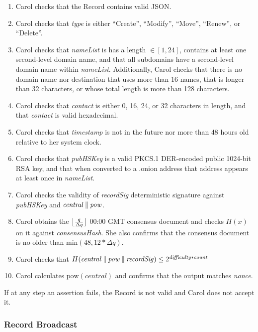 \begin{enumerate}
	\item Carol checks that the Record contains valid JSON.
	\item Carol checks that \emph{type} is either ``Create'', ``Modify'', ``Move'', ``Renew'', or ``Delete''.
	\item Carol checks that \emph{nameList} is has a length $ \in [1,24] $, contains at least one second-level domain name, and that all subdomains have a second-level domain name within \emph{nameList}. Additionally, Carol checks that there is no domain name nor destination that uses more than 16 names, that is longer than 32 characters, or whose total length is more than 128 characters.
	\item Carol checks that \emph{contact} is either 0, 16, 24, or 32 characters in length, and that \emph{contact} is valid hexadecimal.
	\item Carol checks that \emph{timestamp} is not in the future nor more than 48 hours old relative to her system clock.
	\item Carol checks that \emph{pubHSKey} is a valid PKCS.1 DER-encoded public 1024-bit RSA key, and that when converted to a .onion address that address appears at least once in \emph{nameList}.
	\item Carol checks the validity of \emph{recordSig} deterministic signature against \emph{pubHSKey} and $ \mathit{central} \concat \mathit{pow} $.
	\item Carol obtains the $ \floor[\big]{\frac{q}{\Delta q}} $ 00:00 GMT consensus document and checks $ H(x) $ on it against \emph{consensusHash}. She also confirms that the consensus document is no older than $ \mathrm{min}(48, 12 * \Delta q) $.
	\item Carol checks that $ H(\mathit{central} \concat \mathit{pow} \concat \mathit{recordSig}) \leq 2^{\mathit{difficulty} * \mathit{count}} $
	\item Carol calculates $ \mathrm{pow}(\mathit{central}) $ and confirms that the output matches \emph{nonce}.
\end{enumerate}

If at any step an assertion fails, the Record is not valid and Carol does not accept it.

\subsubsection{Record Broadcast}


